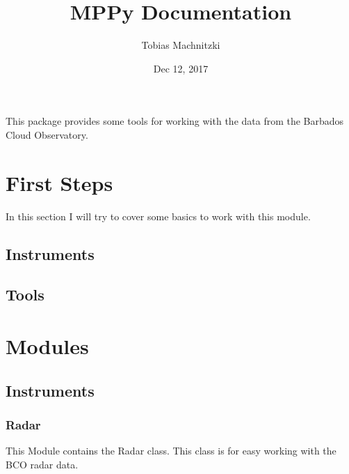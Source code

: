 \documentclass[letterpaper,10pt,english]{sphinxmanual}
\title{MPPy Documentation}
\date{Dec 12, 2017}
\author{Tobias Machnitzki}
\begin{document}
\maketitle
\sphinxtableofcontents
{}\label{\detokenize{index::doc}}


This package provides some tools for working with the data from the Barbados Cloud Observatory.


\chapter{First Steps}
\label{\detokenize{intro::doc}}\label{\detokenize{intro:documentation-of-the-mppy-project}}\label{\detokenize{intro:first-steps}}
In this section I will try to cover some basics to work with this module.


\section{Instruments}
\label{\detokenize{intro:instruments}}

\section{Tools}
\label{\detokenize{intro:tools}}

\chapter{Modules}
\label{\detokenize{modules::doc}}\label{\detokenize{modules:modules}}

\section{Instruments}
\label{\detokenize{modules:instruments}}

\subsection{Radar}
\label{\detokenize{MPPy.Instruments:module-MPPy.Instruments.Radar}}\label{\detokenize{MPPy.Instruments::doc}}\label{\detokenize{MPPy.Instruments:radar}}
This Module contains the Radar class. This class is for easy working with the BCO radar data.
\end{document}
